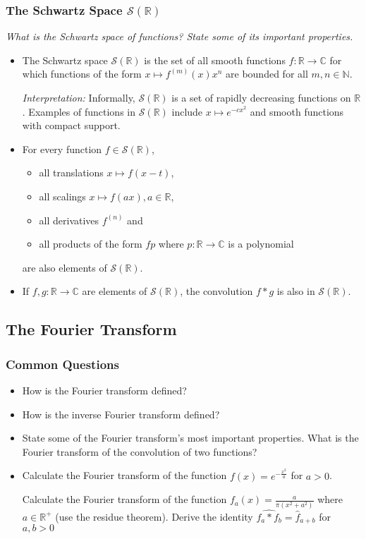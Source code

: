 \documentclass[11pt, a4paper]{article}
\newcommand{\question}[1]{\textit{#1}\vspace{2mm}}
\newcommand{\R}{\mathbb{R}} %
\newcommand{\C}{\mathbb{C}} %
\begin{document}
\subsubsection{The Schwartz Space $  \mathcal{S}(\R) $}
\question{What is the Schwartz space of functions? State some of its important properties.}
\begin{itemize}
	\item The Schwartz space $ \mathcal{S}(\R) $ is the set of all smooth functions $ f:\R \to \C $ for which functions of the form $ x \mapsto f^{(m)}(x)x^n $ are bounded for all $ m, n \in \mathbb{N} $.
	
	\textit{Interpretation:} Informally, $ \mathcal{S}(\R) $ is a set of rapidly decreasing functions on $ \R $. Examples of functions in $ \mathcal{S}(\R) $ include $ x \mapsto e^{-cx^{2}} $ and smooth functions with compact support.

	\item For every function $ f \in  \mathcal{S}(\R) $,
	\begin{itemize}
		\item all translations $ x \mapsto f(x - t) $,
		\item all scalings $ x \mapsto f(ax), a \in \R$,
		\item all derivatives $ f^{(n)} $ and
		\item all products of the form $ fp $ where $ p:\R \to \C $ is a polynomial
	\end{itemize}
	are also elements of $ \mathcal{S}(\R) $.
	
	\item If $ f, g : \R \to \C $ are elements of $ \mathcal{S}(\R)  $, the convolution $ f * g $ is also in $ \mathcal{S}(\R)  $.
\end{itemize}


\subsection{The Fourier Transform}
\subsubsection{Common Questions}
\begin{itemize}
	\item How is the Fourier transform defined? 
	
	\item How is the inverse Fourier transform defined? 
	
	\item State some of the Fourier transform's most important properties. What is the Fourier transform of the convolution of two functions? 
	
	\item 	Calculate the Fourier transform of the function $ f(x) = e^{-\frac{x^2}{a}} $ for $ a > 0 $.
	
	Calculate the Fourier transform of the function $ f_{a}(x) = \frac{a}{\pi (x^2 + a^2)} $ where $ a \in \R^{+} $ (use the residue theorem). Derive the identity $ \widehat{f_{a} * f_{b}} = \widehat{f}_{a+b} $ for $ a, b > 0 $
	
\end{itemize}
\end{document}
